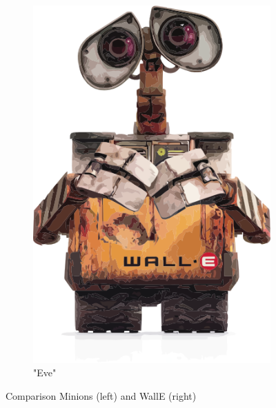\begin{figure}[htb]
\begin{subfigure}[t]{0.49\linewidth}
    \includegraphics[width=\linewidth]{WallE}
    \caption{"Eve"}
    \label{fig:walle}
  \end{subfigure}
  \caption{Comparison Minions (left) and WallE (right)}
  \label{fig:comparision}
\end{figure}
